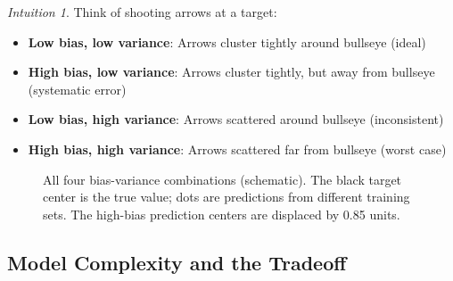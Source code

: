 \documentclass[11pt,twoside]{article}
\numberwithin{equation}{section}
\theoremstyle{plain}
\theoremstyle{definition}
\theoremstyle{remark}
\newtheorem{intuition}[theorem]{Intuition}
\begin{document}
\begin{intuition}
Think of shooting arrows at a target:
\begin{itemize}
\item \textbf{Low bias, low variance}: Arrows cluster tightly around bullseye (ideal)
\item \textbf{High bias, low variance}: Arrows cluster tightly, but away from bullseye (systematic error)
\item \textbf{Low bias, high variance}: Arrows scattered around bullseye (inconsistent)
\item \textbf{High bias, high variance}: Arrows scattered far from bullseye (worst case)
\end{itemize}
\end{intuition}

\begin{figure}[H]
\centering
{}
\caption{All four bias-variance combinations (schematic). The black target center is the true value; dots are predictions from different training sets. The high-bias prediction centers are displaced by 0.85 units.}
\end{figure}

\subsection{Model Complexity and the Tradeoff}
\end{document}
